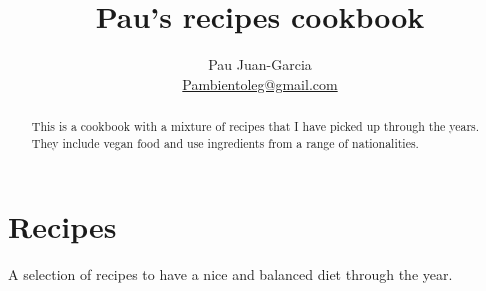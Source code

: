 \documentclass[%
a4paper,
11pt
]{article}
\begin{document}
\title{Pau's recipes cookbook}
\author{Pau Juan-Garcia\\ \href{mailto:Pambientoleg@gmail.com}{Pambientoleg@gmail.com}}
\maketitle

\begin{abstract}
    \noindent This is a cookbook with a mixture of recipes that I have picked up through the years. They include vegan food and use ingredients from a range of nationalities.
\end{abstract}

\tableofcontents

\vspace{5em}

\section{Recipes}
A selection of recipes to have a nice and balanced diet through the year.





%
%
%
%
%
%
%
%
%
%
%
%
%
%
%
%
%
%
%
%
%
%
%
%
%
%
%
%
%
%
%
%
%
%
%
%
%
\end{document}
